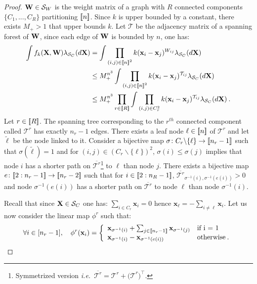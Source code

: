 \begin{proof}
$\mathbf{W} \in \mathcal{S}_W$ is the weight matrix of a graph with $R$ connected components $\{C_1, ..., C_R\}$ partitioning ${[\![n]\!]}$. Since $k$ is upper bounded by a constant, there exists $M_+ > 1$ that upper bounds $k$. Let $\bm{\mathcal{T}}$ be the adjacency matrix of a spanning forest of $\mathbf{W}$, since each edge of $\mathbf{W}$ is bounded by $n$, one has:
\begin{align}
    \int f_{k}(\mathbf{X}, \mathbf{W}) \lambda_{\mathcal{S}_{C}}(d\mathbf{X}) &= \int \prod_{(i,j) \in {[\![n]\!]}^2} k(\mathbf{x}_{i} - \mathbf{x}_{j})^{W_{ij}} \lambda_{\mathcal{S}_{C}}(d\mathbf{X}) \nonumber \\
    &\leq M_+^{n^{3}} \int \prod_{(i,j) \in {[\![n]\!]}^2} k(\mathbf{x}_{i} - \mathbf{x}_{j})^{\mathcal{T}_{ij}} \lambda_{\mathcal{S}_{C}}(d\mathbf{X}) \nonumber \\
    &\leq M_+^{n^{3}} \prod_{r \in {[\![R]\!]}} \int \prod_{(i,j) \in C_{r}^2} k(\mathbf{x}_{i} - \mathbf{x}_{j})^{\mathcal{T}_{ij}} \lambda_{\mathcal{S}_{C}}(d\mathbf{X}) \:. \label{bound_MRF_product_CC}
\end{align}
Let $r \in {[\![R]\!]}$. The spanning tree corresponding to the $r^{th}$ connected component called $\bm{\mathcal{T}}^r$ has exactly $n_r-1$ edges. There exists a leaf node $\ell \in {[\![n]\!]}$ of $\bm{\mathcal{T}}^r$ and let $\tilde{\ell}$ be the node linked to it. Consider a bijective map $\sigma \colon C_r \backslash \{\ell\} \to {[\![n_r - 1]\!]}$ such that $\sigma(\tilde{\ell}) = 1$ and for $(i,j) \in (C_r \backslash \{\ell\})^2$, $\sigma(i) \leq \sigma(j)$ implies that node $i$ has a shorter path on $\overline{\bm{\mathcal{T}}^r}$\footnote{Symmetrized version \textit{i.e.}\ $\overline{\bm{\mathcal{T}}^r} = \bm{\mathcal{T}}^r + \bm{(\mathcal{T}}^r)^\top$.} to $\ell$ than node $j$. There exists a bijective map $e \colon {[\![2:n_r - 1]\!]} \to {[\![n_r - 2]\!]}$ such that for $i \in {[\![2:n_R-1]\!]}$, $\overline{\bm{\mathcal{T}}^r}_{\sigma^{-1}(i), \sigma^{-1}(e(i))} > 0$ and node $\sigma^{-1}(e(i))$ has a shorter path on $\overline{\bm{\mathcal{T}}^r}$ to node $\ell$ than node $\sigma^{-1}(i)$.

Recall that since $\mathbf{X} \in \mathcal{S}_{C}$ one has: $\sum_{i \in C_r} \mathbf{x}_i = 0$ hence $\mathbf{x}_{\ell} = - \sum_{i \neq \ell} \mathbf{x}_i$. Let us now consider the linear map $\phi^r$ such that:
\begin{align*}
\forall i \in [n_r - 1], \quad \phi^r(\mathbf{x}_i) = \left\{
    \begin{array}{ll}
        \mathbf{x}_{\sigma^{-1}(i)} + \sum_{j \in {[\![n_r - 1]\!]}} \mathbf{x}_{\sigma^{-1}(j)} & \mbox{if i = 1}\\
        \mathbf{x}_{\sigma^{-1}(i)} - \mathbf{x}_{\sigma^{-1}(e(i))} & \mbox{otherwise} \:.
    \end{array}
\right.
\end{align*}


\end{proof}
